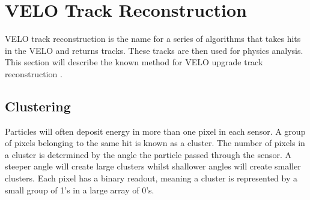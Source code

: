 
\section{VELO Track Reconstruction} %
VELO track reconstruction is the name for a series of algorithms that takes hits in the VELO and returns tracks. These tracks are then used for physics analysis. This section will describe the known method for VELO upgrade track reconstruction \cite{Bird:1620453}.

\subsection{Clustering}
Particles will often deposit energy in more than one pixel in each sensor. A group of pixels belonging to the same hit is known as a cluster. The number of pixels in a cluster is determined by the angle the particle passed through the sensor. A steeper angle will create large clusters whilst shallower angles will create smaller clusters. Each pixel has a binary readout, meaning a cluster is represented by a small group of 1's in a large array of 0's.

